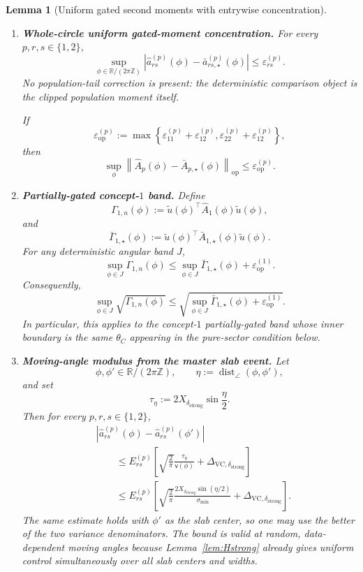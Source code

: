 \documentclass{article} %
\theoremstyle{plain}
\newtheorem{lemma}[theorem]{Lemma}
\theoremstyle{definition}
\theoremstyle{remark}
\begin{document}
\begin{lemma}[Uniform gated second moments with entrywise concentration]
\begin{enumerate}[label=\textnormal{(\roman*)},leftmargin=2.4em]

\item
\textbf{Whole-circle uniform gated-moment concentration.}
For every $p,r,s\in\{1,2\}$,
\[
\boxed{
\sup_{\phi\in\mathbb R/(2\pi\mathbb Z)}
\left|
\widehat a_{rs}^{(p)}(\phi)
-
\bar a_{rs,\star}^{(p)}(\phi)
\right|
\le
\varepsilon_{rs}^{(p)}.
}
\tag{uniform-entry}
\]
No population-tail correction is present: the deterministic comparison
object is the clipped population moment itself.

If
\[
\varepsilon_{\mathrm{op}}^{(p)}
:=
\max\left\{
\varepsilon_{11}^{(p)}+\varepsilon_{12}^{(p)},
\varepsilon_{22}^{(p)}+\varepsilon_{12}^{(p)}
\right\},
\]
then
\[
\boxed{
\sup_\phi
\left\|
\widehat A_p(\phi)
-
\bar A_{p,\star}(\phi)
\right\|_{\mathrm{op}}
\le
\varepsilon_{\mathrm{op}}^{(p)}.
}
\tag{uniform-op}
\]

\item
\textbf{Partially-gated concept-$1$ band.}
Define
\[
\Gamma_{1,n}(\phi)
:=
\widetilde u(\phi)^\top
\widehat A_1(\phi)
\widetilde u(\phi),
\]
and
\[
\bar\Gamma_{1,\star}(\phi)
:=
\widetilde u(\phi)^\top
\bar A_{1,\star}(\phi)
\widetilde u(\phi).
\]
For any deterministic angular band $J$,
\[
\boxed{
\sup_{\phi\in J}\Gamma_{1,n}(\phi)
\le
\sup_{\phi\in J}\bar\Gamma_{1,\star}(\phi)
+
\varepsilon_{\mathrm{op}}^{(1)}.
}
\tag{band-Gamma}
\]
Consequently,
\[
\boxed{
\sup_{\phi\in J}\sqrt{\Gamma_{1,n}(\phi)}
\le
\sqrt{
\sup_{\phi\in J}\bar\Gamma_{1,\star}(\phi)
+
\varepsilon_{\mathrm{op}}^{(1)}
}.
}
\]
In particular, this applies to the concept-$1$ partially-gated band whose
inner boundary is the same $\theta_C$ appearing in the pure-sector
condition below.

\item
\textbf{Moving-angle modulus from the master slab event.}
Let
\[
\phi,\phi'\in\mathbb R/(2\pi\mathbb Z),
\qquad
\eta:=\operatorname{dist}_{\angle}(\phi,\phi'),
\]
and set
\[
\tau_\eta
:=
2X_{\delta_{\mathrm{strong}}}
\sin\frac\eta2.
\]
Then for every $p,r,s\in\{1,2\}$,
\[
\boxed{
\begin{aligned}
&\left|
\widehat a_{rs}^{(p)}(\phi)
-
\widehat a_{rs}^{(p)}(\phi')
\right|
\\
&\qquad
\le
E_{rs}^{(p)}
\left[
\sqrt{\frac2\pi}
\frac{\tau_\eta}{\mathsf v(\phi)}
+
\Delta_{\mathrm{VC},\delta_{\mathrm{strong}}}
\right]
\\
&\qquad
\le
E_{rs}^{(p)}
\left[
\sqrt{\frac2\pi}
\frac{
2X_{\delta_{\mathrm{strong}}}\sin(\eta/2)
}{\sigma_{\min}}
+
\Delta_{\mathrm{VC},\delta_{\mathrm{strong}}}
\right].
\end{aligned}
}
\tag{gate-modulus}\label{eq:gate-modulus}
\]
The same estimate holds with $\phi'$ as the slab center, so one may use the
better of the two variance denominators.  The bound is valid at random,
data-dependent moving angles because Lemma~\ref{lem:Hstrong} already gives
uniform control simultaneously over all slab centers and widths.


\end{enumerate}
\end{lemma}
\end{document}
